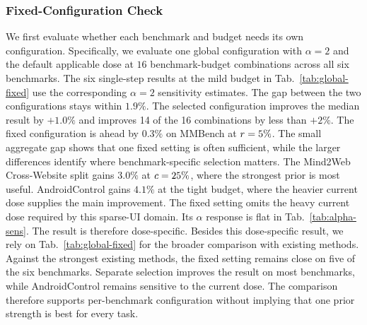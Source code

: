 \subsubsection{Fixed-Configuration Check}
\label{app:calibration}
We first evaluate whether each benchmark and budget needs its own configuration.
%
Specifically, we evaluate one global configuration with $\alpha=2$ and the default applicable dose at $16$ benchmark-budget combinations across all six benchmarks.
%
The six single-step results at the mild budget in Tab.~\ref{tab:global-fixed} use the corresponding $\alpha\!=\!2$ sensitivity estimates.
%
The gap between the two configurations stays within $1.9\%$.
%
The selected configuration improves the median result by $+1.0\%$ and improves 14 of the 16 combinations by less than $+2\%$.
%
The fixed configuration is ahead by $0.3\%$ on MMBench at $r=5\%$.
%
The small aggregate gap shows that one fixed setting is often sufficient, while the larger differences identify where benchmark-specific selection matters.
%
The Mind2Web Cross-Website split gains $3.0\%$ at $c=25\%$, where the strongest prior is most useful.
%
AndroidControl gains $4.1\%$ at the tight budget, where the heavier current dose supplies the main improvement.
%
The fixed setting omits the heavy current dose required by this sparse-UI domain.
%
Its $\alpha$ response is flat in Tab.~\ref{tab:alpha-sens}.
%
The result is therefore dose-specific.
%
Besides this dose-specific result, we rely on Tab.~\ref{tab:global-fixed} for the broader comparison with existing methods.
%
Against the strongest existing methods, the fixed setting remains close on five of the six benchmarks.
%
Separate selection improves the result on most benchmarks, while AndroidControl remains sensitive to the current dose.
%
The comparison therefore supports per-benchmark configuration without implying that one prior strength is best for every task.

